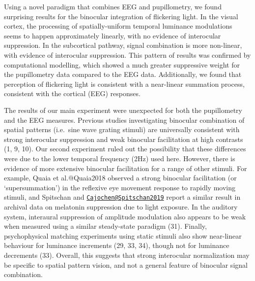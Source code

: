 \documentclass[
]{article}
\begin{document}
Using a novel paradigm that combines EEG and pupillometry, we found surprising results for the binocular integration of flickering light. In the visual cortex, the processing of spatially-uniform temporal luminance modulations seems to happen approximately linearly, with no evidence of interocular suppression. In the subcortical pathway, signal combination is more non-linear, with evidence of interocular suppression. This pattern of results was confirmed by computational modelling, which showed a much greater suppressive weight for the pupillometry data compared to the EEG data. Additionally, we found that perception of flickering light is consistent with a near-linear summation process, consistent with the cortical (EEG) responses.

The results of our main experiment were unexpected for both the pupillometry and the EEG measures. Previous studies investigating binocular combination of spatial patterns (i.e.~sine wave grating stimuli) are universally consistent with strong interocular suppression and weak binocular facilitation at high contrasts (1, 9, 10). Our second experiment ruled out the possibility that these differences were due to the lower temporal frequency (2Hz) used here. However, there is evidence of more extensive binocular facilitation for a range of other stimuli. For example, Quaia et al.@Quaia2018 observed a strong binocular facilitation (or `supersummation') in the reflexive eye movement response to rapidly moving stimuli, and Spitschan and \href{mailto:Cajochen@Spitschan2019}{\nolinkurl{Cajochen@Spitschan2019}} report a similar result in archival data on melatonin suppression due to light exposure. In the auditory system, interaural suppression of amplitude modulation also appears to be weak when measured using a similar steady-state paradigm (31). Finally, psychophysical matching experiments using static stimuli also show near-linear behaviour for luminance increments (29, 33, 34), though not for luminance decrements (33). Overall, this suggests that strong interocular normalization may be specific to spatial pattern vision, and not a general feature of binocular signal combination.
\end{document}
